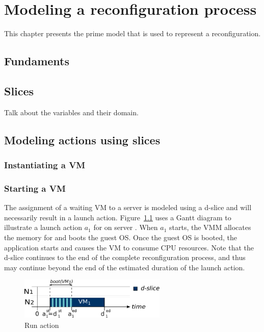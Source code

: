 \chapter{Modeling a reconfiguration process}
\label{ch: model}

This chapter presents the prime model that is used to represent a reconfiguration.


\section{Fundaments}

\section{Slices}

Talk about the variables and their domain.
\section{Modeling actions using slices}


\subsection{Instantiating a VM}

\subsection{Starting a VM}

The assignment of a waiting VM to a server is modeled using a d-slice and
will necessarily result in a launch action. Figure~\ref{fig: run model} uses a Gantt
diagram to illustrate a launch action $a_1$ for  on server
.  When $a_1$ starts, the VMM allocates the memory for 
and boots the guest OS.  Once the guest OS is booted, the application
starts and causes the VM to consume CPU resources. Note that the d-slice
continues to the end of the complete reconfiguration process, and thus may
continue beyond the end of the estimated duration of the launch action.
   
\begin{figure}[htb]
\centering
\includegraphics[width=7cm]{img/run_model}
\caption{Run action}\label{fig: run model}
\end{figure}

